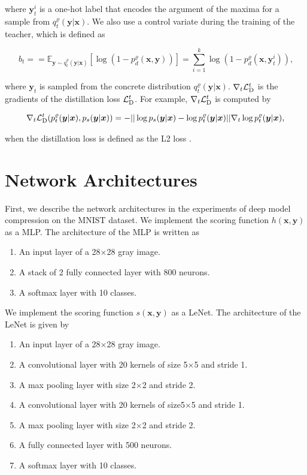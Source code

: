 \documentclass{article}
\newcommand{\OVEC}[1]{\bm{#1}} %
\newcommand{\SVEC}[1]{\bm{#1}} %
\newcommand{\LOSS}[2]{\mathcal{#1}_{\rm{#2}}} %
\newcommand{\EXP}{\mathbb{E}} %
\newcommand{\tchdistloss}{\LOSS{L}{D}^{t}}
\newcommand{\fullpstd}[1]{p_{s}(#1|\OVEC{x})}
\newcommand{\fullptch}[1]{p_{t}^{\varrho}(#1|\OVEC{x})}
\newcommand{\fullqtch}[1]{q_{t}^{\varrho}(#1|\OVEC{x})}
\newcommand{\fullpdis}[1]{p_{d}^{\varrho}(\OVEC{x},#1)}
\newcommand{\stdscore}{h(\OVEC{x},\OVEC{y})}
\newcommand{\priscore}{s(\OVEC{x},\OVEC{y})}
\begin{document}
where $\SVEC{y}^{i}_{t}$ is a one-hot label that encodes the argument of the maxima for a sample from $\fullqtch{\OVEC{y}}$.
We also use a control variate during the training of the teacher, which is defined as
\begin{small}
\begin{equation*}
b_{t}
=
=
\EXP_{\OVEC{y}\sim\fullqtch{\OVEC{y}}}
[\log(1-\fullpdis{\OVEC{y}})]
=
{\textstyle\sum}_{i=1}^{k}\log(1-\fullpdis{\SVEC{y}^{i}_{t}})
\text{,}
\end{equation*}
\end{small}%
where $\SVEC{y}_{t}$ is sampled from the concrete distribution $\fullqtch{\OVEC{y}}$.
$\nabla_{t}\tchdistloss$ is the gradients of the distillation loss $\tchdistloss$.
For example, $\nabla_{t}\tchdistloss$ is computed by
\begin{small}
\begin{equation*}
\begin{aligned}
\nabla_{t}
\tchdistloss(\fullptch{\OVEC{y}},\fullpstd{\OVEC{y}})
=
-
||\log\fullpstd{\OVEC{y}}-\log\fullptch{\OVEC{y}}||
\nabla_{t}\log\fullptch{\OVEC{y}}
\text{,}
\\
\end{aligned}
\end{equation*}
\end{small}%
when the distillation loss is defined as the L2 loss \cite{ba2014deep}.


\section{Network Architectures} \label{app:architecture}

First, we describe the network architectures in the experiments of deep model compression on the MNIST dataset.
We implement the scoring function $\stdscore$ as a MLP.
The architecture of the MLP is written as
\begin{enumerate}
\item An input layer of a 28$\times$28 gray image.
\item A stack of 2 fully connected layer with 800 neurons.
\item A softmax layer with 10 classes.
\end{enumerate}
We implement the scoring function $\priscore$ as a LeNet.
The architecture of the LeNet is given by
\begin{enumerate}
\item An input layer of a 28$\times$28 gray image.
\item A convolutional layer with 20 kernels of size 5$\times$5 and stride 1.
\item A max pooling layer with size 2$\times$2 and stride 2.
\item A convolutional layer with 20 kernels of size5$\times$5 and stride 1.
\item A max pooling layer with size 2$\times$2 and stride 2.
\item A fully connected layer with 500 neurons.
\item A softmax layer with 10 classes.
\end{enumerate}
\end{document}
